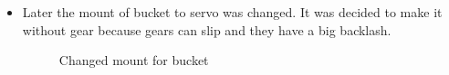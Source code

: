 \begin{itemize}
\item Later the mount of bucket to servo was changed. It was decided to make it without gear because gears can slip and they have a big backlash.
\begin{figure}[H]
	\begin{minipage}[h]{\linewidth}
		\caption{Changed mount for bucket}
	\end{minipage}
\end{figure} 


\end{itemize}
